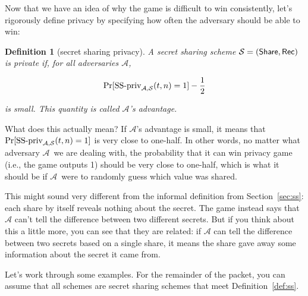 \documentclass[12 pt]{article}
\newtheorem{definition}{Definition}
\def\A{\ensuremath{\mathcal{A}}}
\def\ss{\ensuremath{\mathcal{S}}}
\newcounter{example}[section]
\begin{document}
Now that we have an idea of why the game is difficult to win consistently, 
let's rigorously define privacy by specifying how often the adversary should 
be able to win: 

\begin{definition}[secret sharing privacy]
    A secret sharing scheme $\ss = (\share,\allowbreak \rec)$ is \emph{private} if,
    for all 
    adversaries \A,

    \[
        \Pr[\textnormal{SS-priv}_{\A,\ss}(t,n) = 1] - \frac{1}{2}
    \]

    is small\footnotemark. This quantity is called $\A$'s \emph{advantage}.
\end{definition}

What does this actually mean? If $\A$'s advantage is small, it means that 
$\Pr[\textnormal{SS-priv}_{\A,\ss}(t,n)=1]$ is very close to one-half. In 
other words, no matter what adversary \A~we are dealing with, the probability 
that it can win privacy game (i.e., the game outputs 1) should be very close
to one-half, which is what it should be if \A~were to randomly guess which 
value was shared.

This might sound very different from the informal definition from Section~\ref{sec:ss}:
each share by itself reveals nothing about the secret. The game instead says 
that $\A$ can't tell the difference between two different secrets. But if 
you think about this a little more, you can see that they are related: if 
$\A$ can tell the difference between two secrets based on a single share, 
it means the share gave away some information about the secret it came from.

\bigskip
Let's work through some examples. For the remainder of the packet, you can 
assume that all schemes are secret sharing schemes that meet Definition~\ref{def:ss}.
\end{document}
